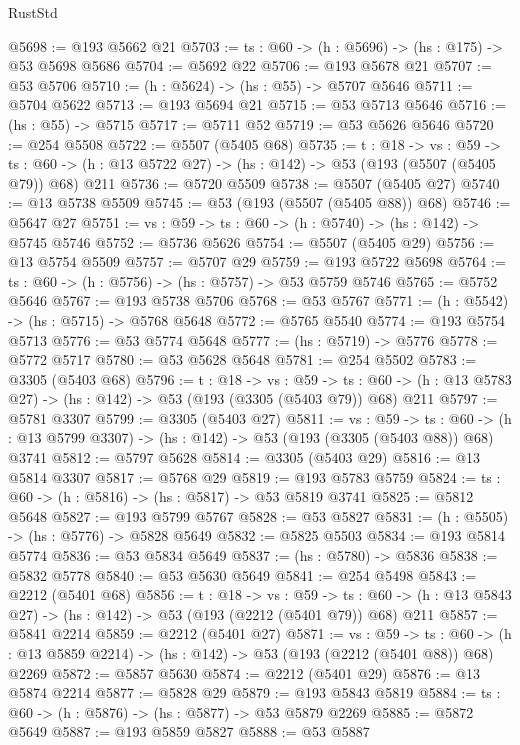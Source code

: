 \begin{lexlean}{RustStd}
\begin{coremodule}
@5698 := @193 @5662 @21
@5703 := {ts : @60} -> (h : @5696) -> (hs : @175) -> @53 @5698 @5686
@5704 := @5692 @22
@5706 := @193 @5678 @21
@5707 := @53 @5706
@5710 := (h : @5624) -> (hs : @55) -> @5707 @5646
@5711 := @5704 @5622
@5713 := @193 @5694 @21
@5715 := @53 @5713 @5646
@5716 := (hs : @55) -> @5715
@5717 := @5711 @52
@5719 := @53 @5626 @5646
@5720 := @254 @5508
@5722 := @5507 (@5405 @68)
@5735 := {t : @18} ->
  {vs : @59} ->
  {ts : @60} -> (h : @13 @5722 @27) -> (hs : @142) -> @53 (@193 (@5507 (@5405 @79)) @68) @211
@5736 := @5720 @5509
@5738 := @5507 (@5405 @27)
@5740 := @13 @5738 @5509
@5745 := @53 (@193 (@5507 (@5405 @88)) @68)
@5746 := @5647 @27
@5751 := {vs : @59} -> {ts : @60} -> (h : @5740) -> (hs : @142) -> @5745 @5746
@5752 := @5736 @5626
@5754 := @5507 (@5405 @29)
@5756 := @13 @5754 @5509
@5757 := @5707 @29
@5759 := @193 @5722 @5698
@5764 := {ts : @60} -> (h : @5756) -> (hs : @5757) -> @53 @5759 @5746
@5765 := @5752 @5646
@5767 := @193 @5738 @5706
@5768 := @53 @5767
@5771 := (h : @5542) -> (hs : @5715) -> @5768 @5648
@5772 := @5765 @5540
@5774 := @193 @5754 @5713
@5776 := @53 @5774 @5648
@5777 := (hs : @5719) -> @5776
@5778 := @5772 @5717
@5780 := @53 @5628 @5648
@5781 := @254 @5502
@5783 := @3305 (@5403 @68)
@5796 := {t : @18} ->
  {vs : @59} ->
  {ts : @60} -> (h : @13 @5783 @27) -> (hs : @142) -> @53 (@193 (@3305 (@5403 @79)) @68) @211
@5797 := @5781 @3307
@5799 := @3305 (@5403 @27)
@5811 := {vs : @59} ->
  {ts : @60} -> (h : @13 @5799 @3307) -> (hs : @142) -> @53 (@193 (@3305 (@5403 @88)) @68) @3741
@5812 := @5797 @5628
@5814 := @3305 (@5403 @29)
@5816 := @13 @5814 @3307
@5817 := @5768 @29
@5819 := @193 @5783 @5759
@5824 := {ts : @60} -> (h : @5816) -> (hs : @5817) -> @53 @5819 @3741
@5825 := @5812 @5648
@5827 := @193 @5799 @5767
@5828 := @53 @5827
@5831 := (h : @5505) -> (hs : @5776) -> @5828 @5649
@5832 := @5825 @5503
@5834 := @193 @5814 @5774
@5836 := @53 @5834 @5649
@5837 := (hs : @5780) -> @5836
@5838 := @5832 @5778
@5840 := @53 @5630 @5649
@5841 := @254 @5498
@5843 := @2212 (@5401 @68)
@5856 := {t : @18} ->
  {vs : @59} ->
  {ts : @60} -> (h : @13 @5843 @27) -> (hs : @142) -> @53 (@193 (@2212 (@5401 @79)) @68) @211
@5857 := @5841 @2214
@5859 := @2212 (@5401 @27)
@5871 := {vs : @59} ->
  {ts : @60} -> (h : @13 @5859 @2214) -> (hs : @142) -> @53 (@193 (@2212 (@5401 @88)) @68) @2269
@5872 := @5857 @5630
@5874 := @2212 (@5401 @29)
@5876 := @13 @5874 @2214
@5877 := @5828 @29
@5879 := @193 @5843 @5819
@5884 := {ts : @60} -> (h : @5876) -> (hs : @5877) -> @53 @5879 @2269
@5885 := @5872 @5649
@5887 := @193 @5859 @5827
@5888 := @53 @5887

\end{coremodule}
\end{lexlean}
